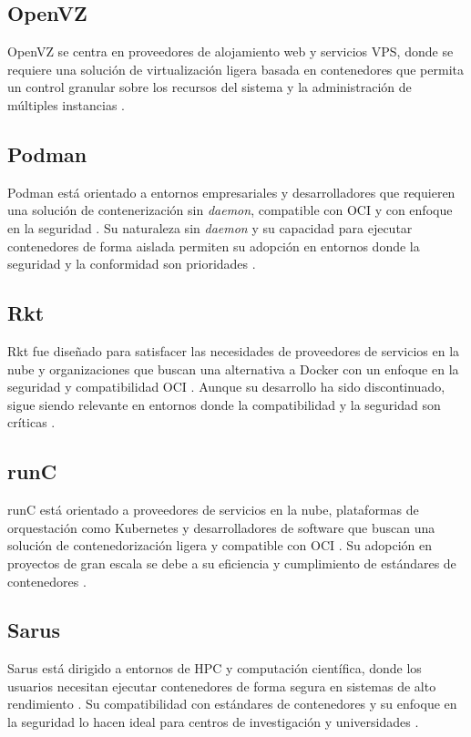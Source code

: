 \subsection{OpenVZ}
\noindent
OpenVZ se centra en proveedores de alojamiento web y servicios VPS, donde se requiere una solución de virtualización ligera basada en contenedores que permita un control granular sobre los recursos del sistema y la administración de múltiples instancias \citep{OpenVZ2015}.

\subsection{Podman}
\noindent
Podman está orientado a entornos empresariales y desarrolladores que requieren una solución de contenerización sin \textit{daemon}, compatible con OCI y con enfoque en la seguridad \citep{Surendhar2024}. Su naturaleza sin \textit{daemon} y su capacidad para ejecutar contenedores de forma aislada permiten su adopción en entornos donde la seguridad y la conformidad son prioridades \citep{Trevor2022}.

\subsection{Rkt}
\noindent
Rkt fue diseñado para satisfacer las necesidades de proveedores de servicios en la nube y organizaciones que buscan una alternativa a Docker con un enfoque en la seguridad y compatibilidad OCI \citep{Lingayat2018}. Aunque su desarrollo ha sido discontinuado, sigue siendo relevante en entornos donde la compatibilidad y la seguridad son críticas \citep{Watada2019}.

\subsection{runC}
\noindent
runC está orientado a proveedores de servicios en la nube, plataformas de orquestación como Kubernetes y desarrolladores de software que buscan una solución de contenedorización ligera y compatible con OCI \citep{Perez2005}. Su adopción en proyectos de gran escala se debe a su eficiencia y cumplimiento de estándares de contenedores \citep{151962df5f7e4b9faba0629540c11439}.

\subsection{Sarus}
\noindent
Sarus está dirigido a entornos de HPC y computación científica, donde los usuarios necesitan ejecutar contenedores de forma segura en sistemas de alto rendimiento \citep{Sarus2021}. Su compatibilidad con estándares de contenedores y su enfoque en la seguridad lo hacen ideal para centros de investigación y universidades \citep{B2020}.

